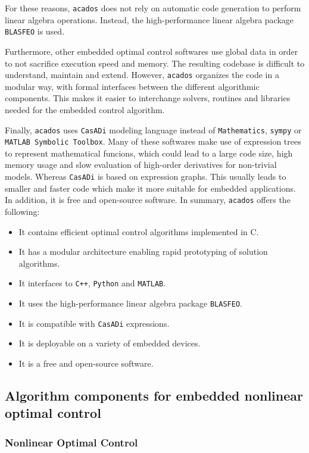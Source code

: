 \documentclass{thesisreport}
\begin{document}
For these reasons, \texttt{acados} does not rely on automatic code generation to perform linear algebra operations. Instead, the high-performance linear algebra package \texttt{BLASFEO} is used. 

Furthermore, other embedded optimal control softwares use global data in order to not sacrifice execution speed and memory. The resulting codebase is difficult to understand, maintain and extend. However, \texttt{acados} organizes the code in a modular way, with formal interfaces between the different algorithmic components. This makes it easier to interchange solvers, routines and libraries needed for the embedded control algorithm.

Finally, \texttt{acados} uses \texttt{CasADi} modeling language instead of \texttt{Mathematics}, \texttt{sympy} or \texttt{MATLAB Symbolic Toolbox}. Many of these softwares make use of expression trees to represent mathematical funcions, which could lead to a large code size, high memory usage and slow evaluation of high-order derivatives for non-trivial models. Whereas \texttt{CasADi} is based on expression graphs. This usually leads to smaller and faster code which make it more suitable for embedded applications. In addition, it is free and open-source software. In summary, \texttt{acados} offers the following:

\begin{itemize}
	\item It contains efficient optimal control algorithms implemented in C.
	\item It has a modular architecture enabling rapid prototyping of solution algorithms.
	\item It interfaces to \texttt{C++}, \texttt{Python} and \texttt{MATLAB}.
	\item It uses the high-performance linear algebra package \texttt{BLASFEO}.
	\item It is compatible with \texttt{CasADi} expressions.
	\item It is deployable on a variety of embedded devices.
	\item It is a free and open-source software.
\end{itemize}

\subsection{Algorithm components for embedded nonlinear optimal control}

\subsubsection{Nonlinear Optimal Control}
\end{document}
